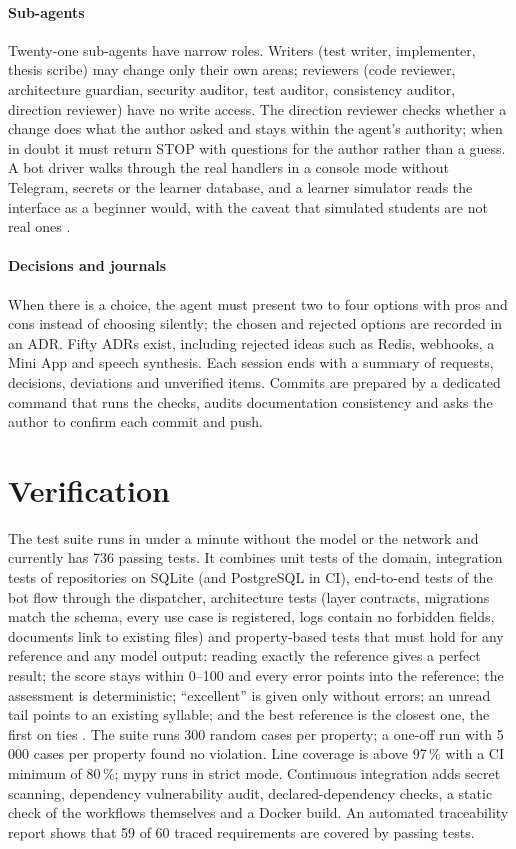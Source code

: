 \paragraph{Sub-agents} Twenty-one sub-agents have narrow roles. Writers (test writer, implementer, thesis
scribe) may change only their own areas; reviewers (code reviewer, architecture guardian, security auditor,
test auditor, consistency auditor, direction reviewer) have no write access. The direction reviewer checks
whether a change does what the author asked and stays within the agent's authority; when in doubt it must
return STOP with questions for the author rather than a guess. A bot driver walks through the real handlers
in a console mode without Telegram, secrets or the learner database, and a learner simulator reads the
interface as a beginner would, with the caveat that simulated students are not real ones
\cite{SRC-083}.

\paragraph{Decisions and journals} When there is a choice, the agent must present two to four options with
pros and cons instead of choosing silently; the chosen and rejected options are recorded in an ADR. Fifty
ADRs exist, including rejected ideas such as Redis, webhooks, a Mini App and speech synthesis. Each session
ends with a summary of requests, decisions, deviations and unverified items. Commits are prepared by a
dedicated command that runs the checks, audits documentation consistency and asks the author to confirm each
commit and push.

\section{Verification}\label{sec:impl-verification}

The test suite runs in under a minute without the model or the network and currently has 736 passing tests.
It combines unit tests of the domain, integration tests of repositories on SQLite (and PostgreSQL in CI),
end-to-end tests of the bot flow through the dispatcher, architecture tests (layer contracts, migrations
match the schema, every use case is registered, logs contain no forbidden fields, documents link to existing
files) and property-based tests that must hold for any reference and any model output: reading exactly the
reference gives a perfect result; the score stays within 0--100 and every error points into the reference;
the assessment is deterministic; ``excellent'' is given only without errors; an unread tail points to an
existing syllable; and the best reference is the closest one, the first on ties \cite{SRC-096}. The suite
runs 300 random cases per property; a one-off run with 5\,000 cases per property found no violation. Line coverage is above
97\,\% with a CI minimum of 80\,\%; mypy runs in strict mode. Continuous integration adds secret scanning,
dependency vulnerability audit, declared-dependency checks, a static check of the workflows themselves and a
Docker build. An automated traceability report shows that 59 of 60 traced requirements are covered by passing
tests.
